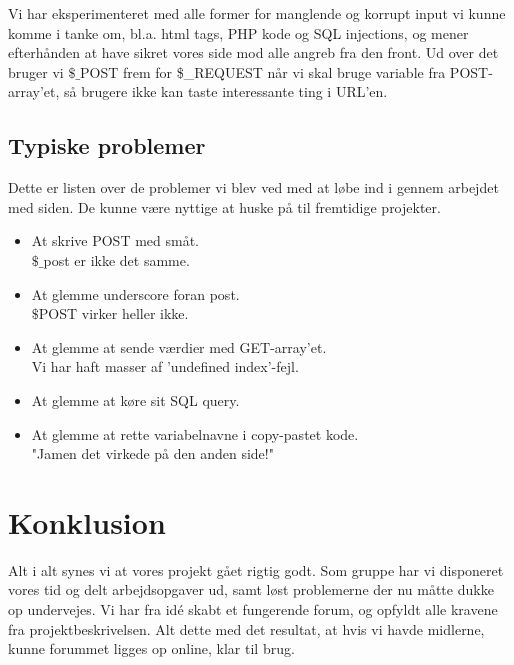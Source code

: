 \documentclass{article}
\begin{document}
Vi har eksperimenteret med alle former for manglende og korrupt input vi kunne komme i tanke om, bl.a. html tags, PHP kode og SQL injections, og mener efterhånden at have sikret vores side mod alle angreb fra den front. Ud over det bruger vi $\$$$\_$POST frem for \$\_REQUEST når vi skal bruge variable fra POST-array'et, så brugere ikke kan taste interessante ting i URL'en.

\subsection{Typiske problemer}
Dette er listen over de problemer vi blev ved med at løbe ind i gennem arbejdet med siden. De kunne være nyttige at huske på til fremtidige projekter.

\begin{itemize}
	\item At skrive POST med småt. \\
		$\$$$\_$post er ikke det samme.
	\item At glemme underscore foran post. \\
		$\$$POST virker heller ikke.
	\item At glemme at sende værdier med GET-array'et. \\
		Vi har haft masser af 'undefined index'-fejl.
	\item At glemme at køre sit SQL query.
	\item At glemme at rette variabelnavne i copy-pastet kode. \\
		"Jamen det virkede på den anden side!"
\end{itemize}

\section{Konklusion}
Alt i alt synes vi at vores projekt gået rigtig godt. Som gruppe har vi disponeret vores tid og delt arbejdsopgaver ud, samt løst problemerne der nu måtte dukke op undervejes. Vi har fra idé skabt et fungerende forum, og opfyldt alle kravene fra projektbeskrivelsen. Alt dette med det resultat, at hvis vi havde midlerne, kunne forummet ligges op online, klar til brug.
\end{document}
